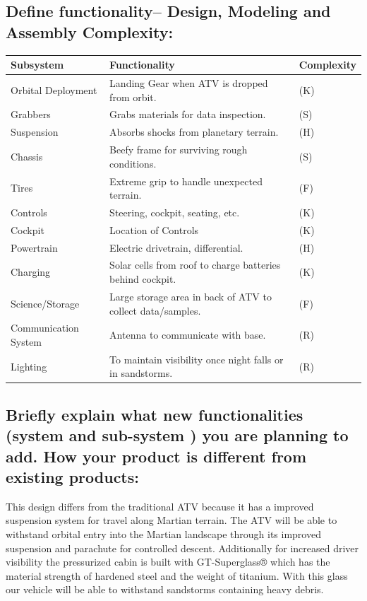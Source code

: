 \subsection{Define functionality– Design, Modeling and Assembly Complexity:}

\begin{center}
\begin{tabular}{lll}
\hline
Subsystem & Functionality & Complexity\\
\hline
Orbital Deployment & Landing Gear when ATV is dropped from orbit. & (K)\\
Grabbers & Grabs materials for data inspection. & (S)\\
Suspension & Absorbs shocks from planetary terrain. & (H)\\
Chassis & Beefy frame for surviving rough conditions. & (S)\\
Tires & Extreme grip to handle unexpected terrain. & (F)\\
Controls & Steering, cockpit, seating, etc. & (K)\\
Cockpit & Location of Controls & (K)\\
Powertrain & Electric drivetrain, differential. & (H)\\
Charging & Solar cells from roof to charge batteries behind cockpit. & (K)\\
Science/Storage & Large storage area in back of ATV to collect data/samples. & (F)\\
Communication System & Antenna to communicate with base. & (R)\\
Lighting & To maintain visibility once night falls or in sandstorms. & (R)\\
\hline
\end{tabular}
\end{center}

\subsection{Briefly explain what new functionalities (system and sub-system ) you are planning to add. How your product is different from existing products:}

This design differs from the traditional ATV because it has a improved suspension system for travel along Martian terrain. The ATV will be able to withstand orbital entry into the Martian landscape through its improved suspension and parachute for controlled descent. Additionally for increased driver visibility the pressurized cabin is built with GT-Superglass® which has the material strength of hardened steel and the weight of titanium. With this glass our vehicle will be able to withstand sandstorms containing heavy debris.

